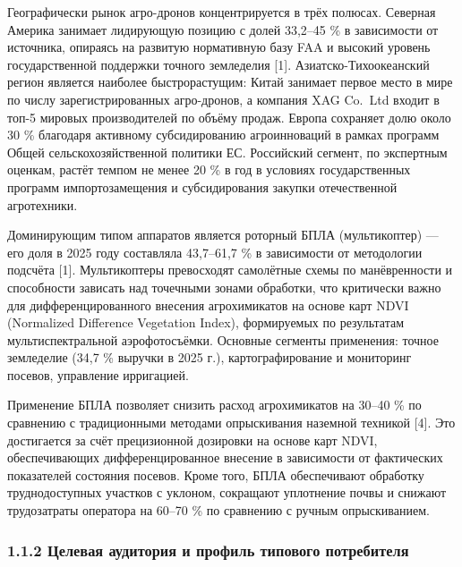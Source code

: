 Географически рынок агро-дронов концентрируется в трёх полюсах. Северная Америка занимает лидирующую позицию с долей 33,2--45 \% в зависимости от источника, опираясь на развитую нормативную базу FAA и высокий уровень государственной поддержки точного земледелия {[}1{]}. Азиатско-Тихоокеанский регион является наиболее быстрорастущим: Китай занимает первое место в мире по числу зарегистрированных агро-дронов, а компания XAG Co.~Ltd входит в топ-5 мировых производителей по объёму продаж. Европа сохраняет долю около 30 \% благодаря активному субсидированию агроинноваций в рамках программ Общей сельскохозяйственной политики ЕС. Российский сегмент, по экспертным оценкам, растёт темпом не менее 20 \% в год в условиях государственных программ импортозамещения и субсидирования закупки отечественной агротехники.

Доминирующим типом аппаратов является роторный БПЛА (мультикоптер) --- его доля в 2025 году составляла 43,7--61,7 \% в зависимости от методологии подсчёта {[}1{]}. Мультикоптеры превосходят самолётные схемы по манёвренности и способности зависать над точечными зонами обработки, что критически важно для дифференцированного внесения агрохимикатов на основе карт NDVI (Normalized Difference Vegetation Index), формируемых по результатам мультиспектральной аэрофотосъёмки. Основные сегменты применения: точное земледелие (34,7 \% выручки в 2025 г.), картографирование и мониторинг посевов, управление ирригацией.

Применение БПЛА позволяет снизить расход агрохимикатов на 30--40 \% по сравнению с традиционными методами опрыскивания наземной техникой {[}4{]}. Это достигается за счёт прецизионной дозировки на основе карт NDVI, обеспечивающих дифференцированное внесение в зависимости от фактических показателей состояния посевов. Кроме того, БПЛА обеспечивают обработку труднодоступных участков с уклоном, сокращают уплотнение почвы и снижают трудозатраты оператора на 60--70 \% по сравнению с ручным опрыскиванием.

\hypertarget{ux446ux435ux43bux435ux432ux430ux44f-ux430ux443ux434ux438ux442ux43eux440ux438ux44f-ux438-ux43fux440ux43eux444ux438ux43bux44c-ux442ux438ux43fux43eux432ux43eux433ux43e-ux43fux43eux442ux440ux435ux431ux438ux442ux435ux43bux44f}{%
\subsubsection{1.1.2 Целевая аудитория и профиль типового потребителя}\label{ux446ux435ux43bux435ux432ux430ux44f-ux430ux443ux434ux438ux442ux43eux440ux438ux44f-ux438-ux43fux440ux43eux444ux438ux43bux44c-ux442ux438ux43fux43eux432ux43eux433ux43e-ux43fux43eux442ux440ux435ux431ux438ux442ux435ux43bux44f}}

